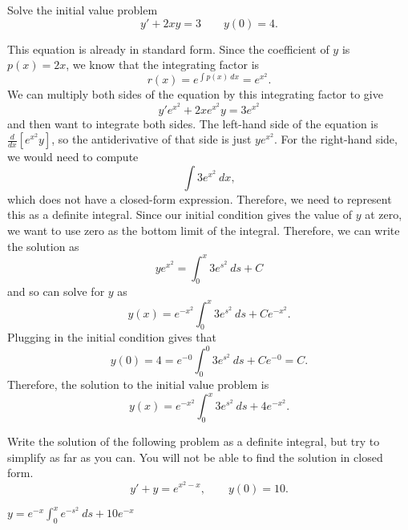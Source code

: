 \begin{example}
Solve the initial value problem
\begin{equation*}
y' + 2xy = 3 \qquad y(0) = 4.
\end{equation*}
\end{example}
\begin{exampleSol}
This equation is already in standard form. Since the coefficient of $y$ is $p(x) = 2x$, we know that the integrating factor is 
\begin{equation*}
r(x) = e^{\int p(x)\ dx} = e^{x^2}.
\end{equation*}
We can multiply both sides of the equation by this integrating factor to give
\begin{equation*}
y'e^{x^2} + 2xe^{x^2}y = 3e^{x^2}
\end{equation*} and then want to integrate both sides. The left-hand side of the equation is $\frac{d}{dx}[e^{x^2}y]$, so the antiderivative of that side is just $ye^{x^2}$. For the right-hand side, we would need to compute
\[ \int 3e^{x^2}\ dx, \] which does not have a closed-form expression. Therefore, we need to represent this as a definite integral. Since our initial condition gives the value of $y$ at zero, we want to use zero as the bottom limit of the integral. Therefore, we can write the solution as
\[ ye^{x^2} = \int_0^x 3e^{s^2}\ ds + C \] and so can solve for $y$ as
\begin{equation*}
y(x) = e^{-x^2} \int_0^x 3e^{s^2}\ ds + Ce^{-x^2}.
\end{equation*}
Plugging in the initial condition gives that
\begin{equation*}
y(0) = 4 = e^{-0} \int_0^0 3e^{s^2}\ ds + Ce^{-0} = C.
\end{equation*}
Therefore, the solution to the initial value problem is
\begin{equation*}
y(x) = e^{-x^2} \int_0^x 3e^{s^2}\ ds + 4e^{-x^2}.
\end{equation*}
\end{exampleSol}


\begin{exercise}
Write the solution of the following problem
as a definite integral, but try to simplify as far as you can.  You will not
be able to find the solution in closed form.
\begin{equation*}
y' + y = e^{x^2-x}, \qquad y(0) = 10 .
\end{equation*}
\end{exercise}
\comboSol{%
}
{%
$y = e^{-x}\int_0^x e^{-s^2}\ ds + 10e^{-x}$
}

